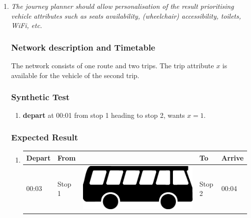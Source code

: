 \documentclass[a4paper,11pt]{article}
\newcommand*{\bus}{\includegraphics[scale=0.02]{img/bus}}
\begin{document}
\begin{enumerate}

\item \textit{The journey planner should allow personalisation of the result prioritising vehicle attributes such as seats availability, (wheelchair) accessibility, toilets, WiFi, etc.}
\subsubsection*{Network description and Timetable}
The network consists of one route and two trips.
The trip attribute $x$ is available for the vehicle of the second trip.

\begin{figure}[h]
\vspace{1em}
\raggedleft
\begin{minipage}{205pt}
\end{minipage}
\label{fig:attributes_network}
\vspace{-2em}
\end{figure}

\subsubsection*{Synthetic Test}
\begin{enumerate}
\item \textbf{depart} at 00:01 from stop 1 heading to stop 2, wants $x = 1$.
\end{enumerate}

\subsubsection*{Expected Result}
\begin{enumerate}
\item
{\scriptsize
\begin{tabular}{p{.75cm} | p{3.0cm} c p{3.0cm} | p{.75cm} }
\hline
\rowcolor{Gray}
Depart & From & & To & Arrive \\
\hline
00:03 & Stop 1 & \bus & Stop 2 & 00:04 \\
\hline
\end{tabular}
}
\end{enumerate}
\newpage


\end{enumerate}
\end{document}
